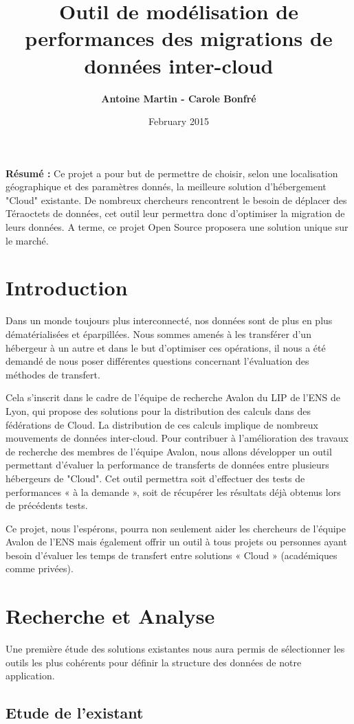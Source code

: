 \documentclass[10pt]{article}
\title{\Huge{Outil de modélisation de performances des migrations de données inter-cloud}}
\author{\textbf{Antoine Martin - Carole Bonfré} }
\date{February 2015}
\begin{document}
\maketitle

\textbf{Résumé : } Ce projet a pour but de permettre de choisir, selon une localisation géographique et des paramètres donnés, la meilleure solution d'hébergement "Cloud" existante. De nombreux chercheurs rencontrent le besoin de déplacer des Téraoctets de données, cet outil leur permettra donc d'optimiser la migration de leurs données. A terme, ce projet Open Source proposera une solution unique sur le marché.

\section{Introduction}

Dans un monde toujours plus interconnecté, nos données sont de plus en plus dématérialisées et éparpillées. Nous sommes amenés à les transférer d’un hébergeur à un autre et dans le but d’optimiser ces opérations, il nous a été demandé de nous poser différentes questions concernant l’évaluation des méthodes de transfert.

Cela s’inscrit dans le cadre de l’équipe de recherche Avalon du LIP de l’ENS de Lyon, qui propose des solutions pour la distribution des calculs dans des fédérations de Cloud. La distribution de ces calculs implique de nombreux mouvements de données inter-cloud. Pour contribuer à l’amélioration des travaux de recherche des membres de l’équipe Avalon, nous allons développer un outil permettant d’évaluer la performance de transferts de données entre plusieurs hébergeurs de "Cloud". Cet outil permettra soit d’effectuer des tests de performances « à la demande », soit de récupérer les résultats déjà obtenus lors de précédents tests.

Ce projet, nous l’espérons, pourra non seulement aider les chercheurs de l’équipe Avalon de l’ENS mais également offrir un outil à tous projets ou personnes ayant besoin d’évaluer les temps de transfert entre solutions « Cloud » (académiques comme privées).

\section{Recherche et Analyse}
Une première étude des solutions existantes nous aura permis de sélectionner les outils les plus cohérents pour définir la structure des données de notre application.
\subsection{Etude de l'existant}
\end{document}
